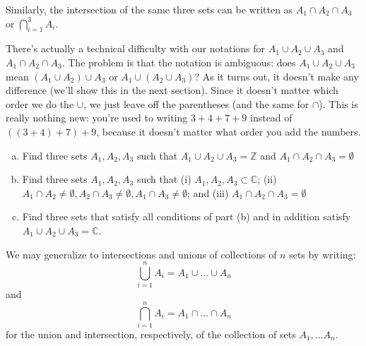 \medskip{}
Similarly, the intersection of the same three sets can be written as $A_{1} \cap A_2 \cap A_3$ or $\bigcap_{i = 1}^{3} A_i.$

\begin{rem}
There's actually a technical difficulty with our notations for  $A_{1} \cup A_2 \cup A_3$ and $A_{1} \cap A_2 \cap A_3$. The problem is that the notation is ambiguous: does $A_{1} \cup A_2 \cup A_3$ mean $(A_{1} \cup A_2) \cup A_3$ or $A_{1} \cup (A_2 \cup A_3)$? As it turns out, it doesn't make any difference (we'll show this in the next section). Since it doesn't matter which order we do the $\cup$, we just leave off the parentheses (and the same for $\cap$). This is really nothing new: you're used to writing $3 + 4 + 7 + 9$ instead of $((3+4)+7)+9$, because it doesn't matter what order you add the numbers.
\end{rem}

\begin{exercise}{12}
\begin{enumerate}[(a)]
\item
Find three sets $A_1, A_2, A_3$ such that $A_{1} \cup A_2 \cup A_3 = {\mathbb Z}$ and $A_{1} \cap A_2 \cap A_3 = \emptyset$
\item
Find three sets $A_1, A_2, A_3$ such that (i) $A_1, A_2, A_3 \subset {\mathbb C}$; (ii) $A_1 \cap A_2 \neq \emptyset, A_2 \cap A_3 \neq  \emptyset, A_1 \cap A_3 \neq \emptyset$; and (iii) $A_{1} \cap A_2 \cap A_3 = \emptyset$
\item
Find three sets that satisfy all conditions of part (b) and in addition satisfy $A_{1} \cup A_2 \cup A_3 = {\mathbb C}$.
\end{enumerate}
\end{exercise}

\noindent
We may generalize to intersections and unions of collections of $n$ sets by writing:
\[
\bigcup_{i = 1}^{n} A_{i} = A_{1} \cup \ldots \cup A_n
\]
and
\[
\bigcap_{i = 1}^{n} A_{i} = A_{1} \cap \ldots \cap A_n
\]
for the union and intersection, respectively, of the collection of sets $A_1, \ldots A_n$.




